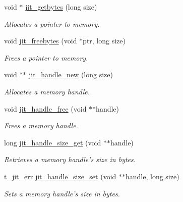 \begin{DoxyCompactItemize}
\item 
void $\ast$ \hyperlink{group__memorymod_ga348f78687a0aabb79d772d633cc679cc}{jit\_\-getbytes} (long size)
\begin{DoxyCompactList}\small\item\em Allocates a pointer to memory. \item\end{DoxyCompactList}\item 
void \hyperlink{group__memorymod_ga4a6a1b9a98f66b50735f69e6acf64af0}{jit\_\-freebytes} (void $\ast$ptr, long size)
\begin{DoxyCompactList}\small\item\em Frees a pointer to memory. \item\end{DoxyCompactList}\item 
void $\ast$$\ast$ \hyperlink{group__memorymod_ga09f5e82fafd1de78638c36105860a635}{jit\_\-handle\_\-new} (long size)
\begin{DoxyCompactList}\small\item\em Allocates a memory handle. \item\end{DoxyCompactList}\item 
void \hyperlink{group__memorymod_ga2710dd7978b8e7f406b525261fb42346}{jit\_\-handle\_\-free} (void $\ast$$\ast$handle)
\begin{DoxyCompactList}\small\item\em Frees a memory handle. \item\end{DoxyCompactList}\item 
long \hyperlink{group__memorymod_gac31e411720c7f4c3ed1d6d9e4bebd513}{jit\_\-handle\_\-size\_\-get} (void $\ast$$\ast$handle)
\begin{DoxyCompactList}\small\item\em Retrieves a memory handle's size in bytes. \item\end{DoxyCompactList}\item 
t\_\-jit\_\-err \hyperlink{group__memorymod_ga326dbdb81cd24ec26384845cd624af7b}{jit\_\-handle\_\-size\_\-set} (void $\ast$$\ast$handle, long size)
\begin{DoxyCompactList}\small\item\em Sets a memory handle's size in bytes. \item\end{DoxyCompactList}\item 

\end{DoxyCompactItemize}
